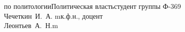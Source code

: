 


\usepackage{color}
\usepackage[colorlinks,linkcolor=black,filecolor=blue,citecolor=darkgreen]{hyperref}


    {по политологии}{Политическая власть}{студент группы Ф-369\\Чечеткин~И.~А.}
    {m}{к.ф.н., доцент\\Леонтьев~А.~Н.}{m}
        
    \tableofcontents
    \thispagestyle{empty}
    \newpage
    
